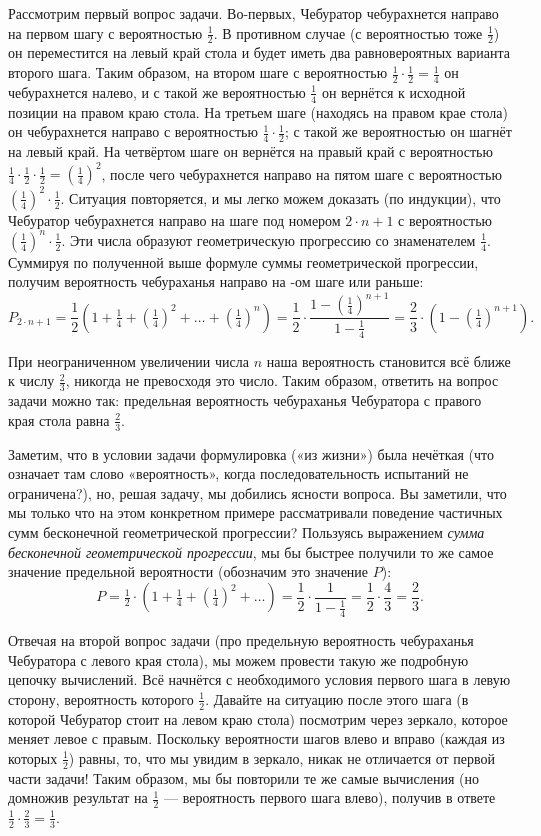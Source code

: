 \documentclass{article}
\begin{document}
Рассмотрим первый вопрос задачи. 
Во-первых, Чебуратор чебурахнется направо на первом шагу с вероятностью $\tfrac12$. 
В противном случае (с вероятностью тоже $\tfrac12$) он переместится на левый край стола и будет иметь два равновероятных варианта второго шага. Таким образом, на втором шаге с вероятностью $\tfrac12\cdot\tfrac12=\tfrac14$ он чебурахнется налево, 
и с такой же вероятностью  $\tfrac14$ он вернётся к исходной позиции на правом краю стола. 
На третьем шаге (находясь на правом крае стола) он чебурахнется направо с вероятностью $\tfrac14\cdot\tfrac12$; 
с такой же вероятностью он шагнёт на левый край. 
На четвёртом шаге он вернётся на правый край с вероятностью $\tfrac14\cdot\tfrac12\cdot\tfrac12=(\tfrac14)^2$, после чего чебурахнется направо на пятом шаге с вероятностью $(\tfrac14)^2\cdot\tfrac12$. 
Ситуация повторяется, и мы легко можем доказать (по индукции), что Чебуратор чебурахнется направо на шаге под номером $2{\cdot}n+1$ 
с вероятностью $(\tfrac14)^n\cdot\tfrac12$. 
Эти числа образуют геометрическую прогрессию со знаменателем $\tfrac14$. Суммируя по полученной выше формуле суммы геометрической прогрессии, получим вероятность чебураханья направо на -ом шаге или раньше:
\[
P_{2\cdot n+1}
=\frac12(1+\tfrac14+(\tfrac14)^2+\dots+(\tfrac14)^n)
=\frac12\cdot\frac{1-(\frac14)^{n+1}}{1-\frac14}
=\frac23\cdot\left(1-(\tfrac14)^{n+1}\right).\]

При неограниченном увеличении числа $n$ наша вероятность становится всё ближе к числу $\tfrac23$, никогда не превосходя это число. Таким образом, ответить на вопрос задачи можно так: предельная вероятность чебураханья Чебуратора с правого края стола равна $\tfrac23$. 

Заметим, что в условии задачи формулировка («из жизни») была нечёткая (что означает там слово «вероятность», когда последовательность испытаний не ограничена?), но, решая задачу, мы добились ясности вопроса. Вы заметили, что мы только что на этом конкретном примере рассматривали поведение частичных сумм бесконечной геометрической прогрессии? 
Пользуясь выражением \emph{сумма бесконечной геометрической прогрессии}, 
мы бы быстрее получили то же самое значение предельной вероятности (обозначим это значение $P$):
\[P=\tfrac12\cdot(1+\tfrac14+(\tfrac14)^2+\dots)=\frac12\cdot\frac1{1-\frac14}=\frac12\cdot\frac43=\frac23.\]

Отвечая на второй вопрос задачи (про предельную вероятность чебураханья Чебуратора с левого края стола), мы можем провести такую же подробную цепочку вычислений. 
Всё начнётся с необходимого условия первого шага в левую сторону, вероятность которого $\tfrac12$. 
Давайте на ситуацию после этого шага (в которой Чебуратор стоит на левом краю стола) посмотрим через зеркало, 
которое меняет левое с правым. 
Поскольку вероятности шагов влево и вправо (каждая из которых $\tfrac12$) равны, то, что мы увидим в зеркало, никак не отличается от первой части задачи! 
Таким образом, мы бы повторили те же самые вычисления (но домножив результат на $\tfrac12$ --- вероятность первого шага влево), получив в ответе $\tfrac12\cdot\tfrac23=\tfrac13$.
\end{document}
